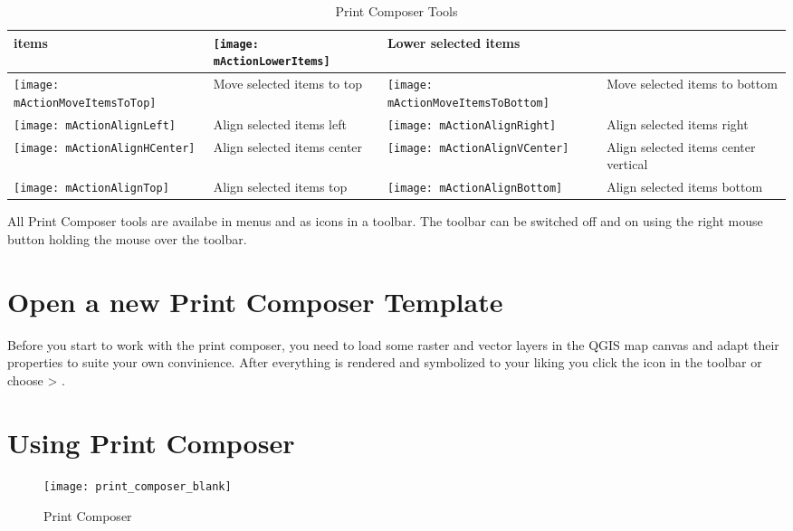 \begin{table}[h]
\begin{tabular}{|m{1cm}|m{5.4cm}|m{1cm}|m{5.4cm}|}
 items  &
 \texttt{[image: mActionLowerItems]} & Lower selected items \\
 \hline \texttt{[image: mActionMoveItemsToTop]} & Move selected
 items to top & 
 \texttt{[image: mActionMoveItemsToBottom]} & Move selected
 items to bottom \\
 \hline \texttt{[image: mActionAlignLeft]} & Align selected 
 items left &
 \texttt{[image: mActionAlignRight]} & Align selected items 
 right \\
 \hline \texttt{[image: mActionAlignHCenter]} & Align selected 
 items center &
 \texttt{[image: mActionAlignVCenter]} & Align selected items
 center vertical \\
 \hline \texttt{[image: mActionAlignTop]} & Align selected
 items top &
 \texttt{[image: mActionAlignBottom]} & Align selected
 items bottom \\
\hline
\end{tabular}
\caption{Print Composer Tools}\label{tab:printcomposer_tools}
\end{table}

All Print Composer tools are availabe in menus and as icons in a toolbar. The
toolbar can be switched off and on using the right mouse button holding the
mouse over the toolbar.

\section{Open a new Print Composer Template}\label{composertemplates}

Before you start to work with the print composer, you need to load some
raster and vector layers in the QGIS map canvas and adapt their properties
to suite your own convinience. After everything is rendered and symbolized to
your liking you click the 
icon in the toolbar or choose  >
.

\section{Using Print Composer}\label{label_useprintcomposer} 

\begin{figure}[ht]
   \centering
   \texttt{[image: print\_composer\_blank]}
   \caption{Print Composer \nixcaption}\label{fig:print_composer_blank}
\end{figure}

